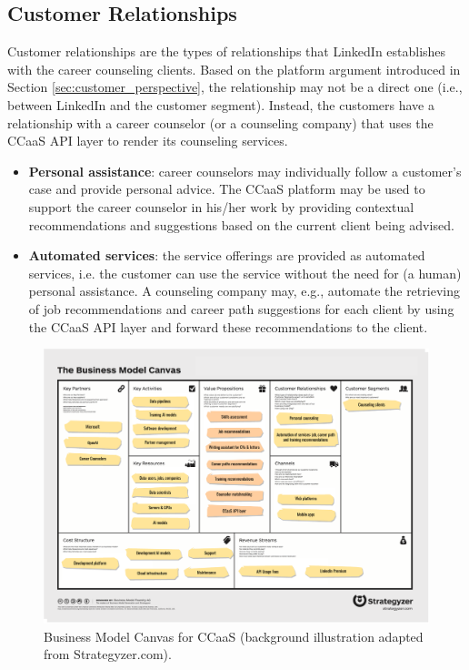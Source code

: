 \subsection{Customer Relationships}

Customer relationships are the types of relationships that LinkedIn establishes with the career
counseling clients. Based on the platform argument introduced in Section \ref{sec:customer_perspective},
the relationship may not be a direct one (i.e., between LinkedIn and the customer segment). Instead, 
the customers have a relationship with a career counselor (or a counseling company) that uses the
CCaaS API layer to render its counseling services.

\begin{itemize}
    \item \textbf{Personal assistance}: career counselors may individually follow a customer's case and 
            provide personal advice. The CCaaS platform may be used to support the career counselor
            in his/her work by providing contextual recommendations and suggestions based on the 
            current client being advised.
    \item \textbf{Automated services}: the service offerings are provided as automated services, i.e. 
            the customer can use the service without the need for (a human) personal assistance.
            A counseling company may, e.g., automate the retrieving of job recommendations and 
            career path suggestions for each client by using the CCaaS API layer and forward
            these recommendations to the client. 
\end{itemize}

\begin{landscape}
        \begin{figure}
                \centering
                \caption{Business Model Canvas for CCaaS (background illustration adapted from Strategyzer.com).}
                \label{fig:bmc}
                \includegraphics[width=1.3\textwidth]{figures/bmc.pdf}
        \end{figure}
\end{landscape}

